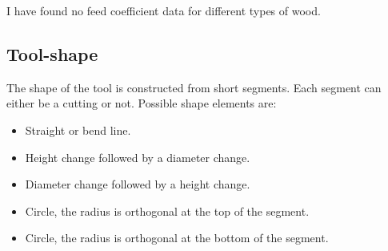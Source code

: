 I have found no feed coefficient data for different types of wood.

\subsection{Tool-shape}

The shape of the tool is constructed from short segments.
Each segment can either be a cutting or not.
Possible shape elements are:

\begin{itemize}
\item Straight or bend line.
\item Height change followed by a diameter change.
\item Diameter change followed by a height change.
\item Circle, the radius is orthogonal at the top of the segment.
\item Circle, the radius is orthogonal at the bottom of the segment.
\end{itemize}

